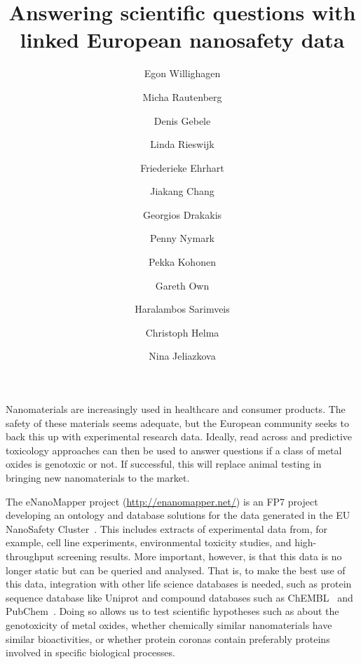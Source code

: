 \documentclass{llncs}
\begin{document}
\title{Answering scientific questions with linked European nanosafety data}

\author{
  Egon Willighagen \and
  Micha Rautenberg \and
  Denis Gebele \and
  Linda Rieswijk \and
  Friederieke Ehrhart \and
  Jiakang Chang \and
  Georgios Drakakis \and
  Penny Nymark \and
  Pekka Kohonen \and
  Gareth Own \and
  Haralambos Sarimveis \and
  Christoph Helma \and
  Nina Jeliazkova
}


\maketitle

Nanomaterials are increasingly used in healthcare and consumer products. The 
safety of these materials seems adequate, but the European community seeks to 
back this up with experimental research data. Ideally, read across and 
predictive toxicology approaches can then be used to answer questions if a class 
of metal oxides is genotoxic or not. If successful, this will replace animal 
testing in bringing new nanomaterials to the market.

The eNanoMapper project (\url{http://enanomapper.net/}) is an FP7 project developing
an ontology and database  solutions for the data generated in the EU NanoSafety
Cluster~\cite{Hastings2015,Jeliazkova2015}. This
includes extracts of experimental data from, for example, cell line experiments, 
environmental toxicity studies, and high-throughput screening results. More 
important, however, is that this data is no longer static but can be queried and 
analysed. That is, to make the best use of this data, integration with other 
life science databases is needed, such as protein sequence database like Uniprot 
and compound databases such as ChEMBL~\cite{Willighagen2013} and
PubChem~\cite{Fu2015}. Doing so allows us to 
test scientific hypotheses such as about the genotoxicity of metal oxides, 
whether chemically similar nanomaterials have similar bioactivities, or whether 
protein coronas contain preferably proteins involved in specific biological 
processes.
\end{document}
